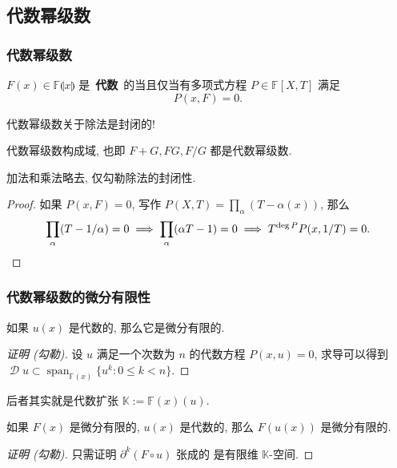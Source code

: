 \documentclass{ctexbeamer}
\newcommand{\bbF}{\mathbb F}
\DeclareMathOperator{\Span}{span}
\DeclareMathOperator{\calD}{\mathcal D}
\begin{document}
\subsection{代数幂级数}

\begin{frame}
  \frametitle{代数幂级数}

  \begin{definition}[代数幂级数]
    $F(x)\in \mathbb F\llparenthesis x\rrparenthesis$ 是~\textbf{代数}~的当且仅当有多项式方程 $P\in \bbF[X, T]$ 满足
    \begin{equation}
      P(x, F) = 0.
    \end{equation}
  \end{definition}
  代数幂级数关于除法是封闭的!
  \begin{theorem}
    代数幂级数构成域, 也即 $F + G, F G, F/G$ 都是代数幂级数.
  \end{theorem}
  加法和乘法略去, 仅勾勒除法的封闭性.
  \begin{proof}
    如果 $P(x, F) = 0$, 写作 $P(X, T) = \prod_\alpha (T - \alpha(x))$, 那么
    \begin{equation}
      \prod_\alpha (T - 1/\alpha) = 0 \implies 
      \prod_\alpha (\alpha T - 1) = 0 \implies
      T^{\deg P} P(x, 1/T) = 0. \qedhere
    \end{equation}
  \end{proof}

\end{frame}

\begin{frame}
  \frametitle{代数幂级数的微分有限性}

  \begin{theorem}
    如果 $u(x)$ 是代数的, 那么它是微分有限的.
  \end{theorem}
  \begin{proof}[证明 (勾勒)]
    设 $u$ 满足一个次数为 $n$ 的代数方程 $P(x, u) = 0$, 求导可以得到
    $\calD u \subset \Span_{\bbF(x)} \{ u^k : 0\leq k < n \}$.
  \end{proof}
  后者其实就是代数扩张 $\mathbb K := \bbF(x)(u)$.

  \begin{theorem}
    如果 $F(x)$ 是微分有限的, $u(x)$ 是代数的, 那么 $F(u(x))$ 是微分有限的.
  \end{theorem}
  \begin{proof}[证明 (勾勒)]
    只需证明 $\partial^k (F\circ u)$ 张成的
    是有限维 $\mathbb K$-空间.
  \end{proof}

\end{frame}
\end{document}
